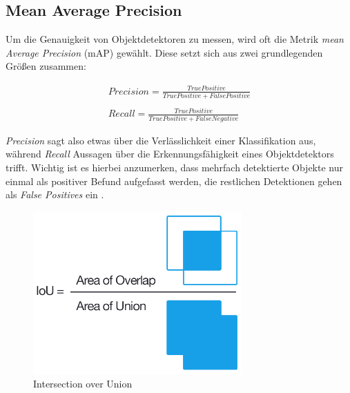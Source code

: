 \subsection*{Mean Average Precision}

Um die Genauigkeit von Objektdetektoren zu messen, wird oft die Metrik \textit{mean Average Precision} (mAP) gewählt. Diese setzt sich aus zwei grundlegenden Größen zusammen:

\begin{equation} \label{precisionandrecall}
\begin{split}
Precision = \frac{True Positive}{True Positive + False Positive} \\
\\
Recall = \frac{True Positive}{True Positive + False Negative}
\end{split}
\end{equation}

\textit{Precision} sagt also etwas über die Verlässlichkeit einer Klassifikation aus, während \textit{Recall} Aussagen über die Erkennungsfähigkeit eines Objektdetektors trifft. Wichtig ist es hierbei anzumerken, dass mehrfach detektierte Objekte nur einmal als positiver Befund aufgefasst werden, die restlichen Detektionen gehen als \textit{False Positives} ein \cite{PaulHenderson.2017}.

\begin{figure}[ht]
	\begin{center}
		\includegraphics[width=8cm]{Bilder/iou_equation.png} 
		\caption[Intersection over Union]{Intersection over Union \cite{AdrianRosebrock.20161107}}
		\label{iou}
	\end{center}
\end{figure}

